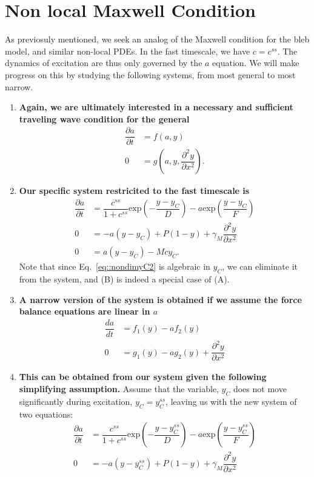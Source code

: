 \section{Non local Maxwell Condition}



As previosuly mentioned, we seek an analog of the Maxwell condition for the bleb model, and similar non-local PDEs. In the fast timescale, we have $c = c^{ss}$.  The dynamics of excitation are thus only governed by the $a$ equation. We will make progress on this by studying the following systems, from most general to most narrow.
\begin{enumerate}[label=(\Alph*)]
\item \textbf{Again, we are ultimately interested in a necessary and sufficient traveling wave condition for the general}
\begin{align}
\dfrac{\partial a}{ \partial t}  & =  f(a,y)\\
0 & =g \left(a,y,\dfrac{\partial^2 y}{\partial x^2}\right).
\end{align}

\item\textbf{Our specific system restricited to the fast timescale is}
\begin{align}
\dfrac{\partial a}{ \partial t}  & =  \dfrac{c^{ss}}{1+c^{ss}} \mbox{exp}\left(-\dfrac{y-y_C}{D}\right) - a \mbox{exp} \left(\dfrac{y-y_C}{F} \right)\label{eq::a_ODE}\\
0 & = -a(y - y_C) + P (1-y) + \gamma_M \dfrac{\partial^2 y}{\partial x^2}\label{eq::yM_eq} \\
0 & = a(y-y_C) - Mcy_C\label{eq::nondimyC2}.
\end{align} 
Note that since Eq.~\ref{eq::nondimyC2} is algebraic in $y_C$, we can eliminate it from the system, and (B) is indeed a special case of (A). 
\item \textbf{A narrow version of the system is obtained if we assume the force balance equations are linear in $a$}
\begin{align}
\dfrac{da}{ dt}  & = f_1(y) - a f_2(y)\label{eq::gen_a}\\
0 & = g_1(y) - ag_2(y) +  \dfrac{\partial^2 y}{\partial x^2}\label{eq::gen_ym}
\end{align}
\item \textbf{This can be obtained from our system given the following simplifying assumption.} Assume that the variable, $y_C$ does not move significantly during excitation, $y_C = y_C^{ss}$, leaving us with the new system of two equations:
\begin{align}
\dfrac{\partial a}{ \partial t}  & =  \dfrac{c^{ss}}{1+c^{ss}} \mbox{exp}\left(-\dfrac{y-y_C^{ss}}{D}\right) - a \mbox{exp} \left(\dfrac{y-y_C^{ss}}{F} \right)\label{eq::a_ODE}\\
0 & = -a(y - y_C^{ss}) + P (1-y) + \gamma_M \dfrac{\partial^2 y}{\partial x^2}\label{eq::yM_eq}
\end{align} 
\end{enumerate}

